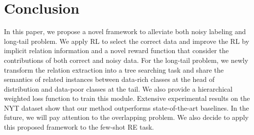 \documentclass{article}
\begin{document}
\section{Conclusion}

In this paper, we propose a novel framework to alleviate both noisy labeling and long-tail problem. We apply RL to select the correct data and improve the RL by implicit relation information and a novel reward function that consider the contributions of both correct and noisy data. For the long-tail problem, we newly transform the relation extraction into a tree searching task and share the semantics of related instances between data-rich classes at the head of distribution and data-poor classes at the tail. We also provide a hierarchical weighted loss function to train this module. Extensive experimental results on the NYT dataset show that our method outperforms state-of-the-art baselines. In the future, we will pay attention to the overlapping problem. We also decide to apply this proposed framework to the few-shot RE task.





\end{document}
